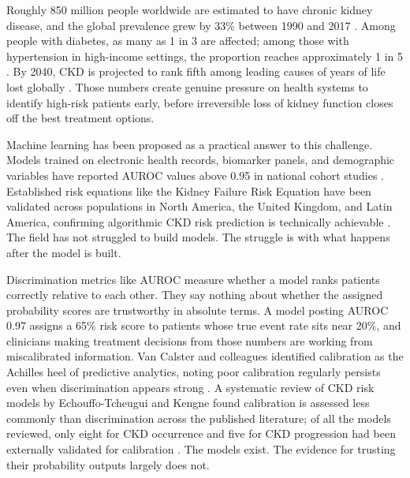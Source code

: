 
Roughly 850 million people worldwide are estimated to have chronic kidney
disease, and the global prevalence grew by 33\% between 1990 and 2017
\citep{Francis2024}. Among people with diabetes, as many as 1 in 3 are
affected; among those with hypertension in high-income settings, the proportion
reaches approximately 1 in 5 \citep{Francis2024}. By 2040, CKD is projected to
rank fifth among leading causes of years of life lost globally
\citep{Francis2024}. Those numbers create genuine pressure on health systems to
identify high-risk patients early, before irreversible loss of kidney function
closes off the best treatment options.

Machine learning has been proposed as a practical answer to this challenge.
Models trained on electronic health records, biomarker panels, and demographic
variables have reported AUROC values above 0.95 in national cohort studies
\citep{Krishnamurthy2021, Bai2022, Li2025, Sabanayagam2025}. Established risk
equations like the Kidney Failure Risk Equation have been validated across
populations in North America, the United Kingdom, and Latin America, confirming
algorithmic CKD risk prediction is technically achievable
\citep{Tangri2016, Major2019, BravoZuniga2025}. The field has not struggled to
build models. The struggle is with what happens after the model is built.

Discrimination metrics like AUROC measure whether a model ranks patients
correctly relative to each other. They say nothing about whether the assigned
probability scores are trustworthy in absolute terms. A model posting AUROC 0.97
assigns a 65\% risk score to patients whose true event rate sits near 20\%, and
clinicians making treatment decisions from those numbers are working from
miscalibrated information. Van Calster and colleagues identified calibration as
the Achilles heel of predictive analytics, noting poor calibration regularly
persists even when discrimination appears strong \citep{VanCalster2019}. A
systematic review of CKD risk models by Echouffo-Tcheugui and Kengne found
calibration is assessed less commonly than discrimination across the published
literature; of all the models reviewed, only eight for CKD occurrence and five
for CKD progression had been externally validated for calibration
\citep{EchouffoTcheugui2012}. The models exist. The evidence for trusting their
probability outputs largely does not.


